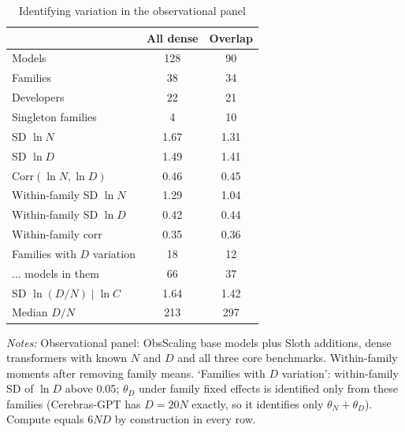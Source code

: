 \begin{table}[!htbp]
\centering
\small
\begin{threeparttable}
\caption{Identifying variation in the observational panel}
\label{tab:m4_design_audit}
\begin{tabular}{lcc}
\toprule
 & All dense & Overlap \\
\midrule
Models & 128 & 90 \\
Families & 38 & 34 \\
Developers & 22 & 21 \\
Singleton families & 4 & 10 \\
SD $\ln N$ & 1.67 & 1.31 \\
SD $\ln D$ & 1.49 & 1.41 \\
Corr$(\ln N,\ln D)$ & 0.46 & 0.45 \\
Within-family SD $\ln N$ & 1.29 & 1.04 \\
Within-family SD $\ln D$ & 0.42 & 0.44 \\
Within-family corr & 0.35 & 0.36 \\
Families with $D$ variation & 18 & 12 \\
... models in them & 66 & 37 \\
SD $\ln(D/N)\mid\ln C$ & 1.64 & 1.42 \\
Median $D/N$ & 213 & 297 \\
\bottomrule
\end{tabular}
\begin{tablenotes}[flushleft]
\footnotesize
\item \textit{Notes:} Observational panel: ObsScaling base models plus Sloth additions, dense transformers with known $N$ and $D$ and all three core benchmarks. Within-family moments after removing family means. `Families with $D$ variation': within-family SD of $\ln D$ above 0.05; $\theta_D$ under family fixed effects is identified only from these families (Cerebras-GPT has $D=20N$ exactly, so it identifies only $\theta_N+\theta_D$). Compute equals $6ND$ by construction in every row.
\end{tablenotes}
\end{threeparttable}
\end{table}
